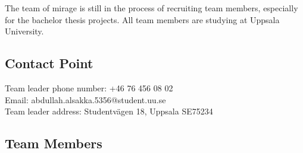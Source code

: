 \documentclass[12pt,a4paper]{report}
\begin{document}
The team of \ac{mirage} is still in the process of recruiting team members, especially for the bachelor thesis projects. All team members are studying at Uppsala University.

\subsection{Contact Point}

Team leader phone number: +46 76 456 08 02\\
Email: abdullah.alsakka.5356@student.uu.se\\
Team leader address: Studentvägen 18, Uppsala SE75234

\subsection{Team Members}
\end{document}
